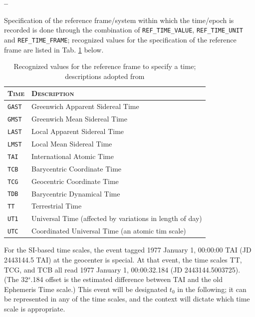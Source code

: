 \documentclass[a4paper,10pt,bibtotoc]{scrreprt}
\begin{document}
\begin{list}{\textbf{--}}{}
\item Specification of the reference frame/system within which the
  time/epoch is recorded is done through the combination of
  \verb|REF_TIME_VALUE|, \verb|REF_TIME_UNIT| and
  \verb|REF_TIME_FRAME|; recognized values for the specification of
  the reference frame are listed in Tab. \ref{tab:reference-frames-time} below.
  
  \begin{table}[ht]
    \centering
    \begin{tabular}{|p{3cm}p{11cm}|}
      \hline
      \textsc{Time} & \textsc{Description} \\
      \hline \hline
      \texttt{GAST} & Greenwich Apparent Sidereal Time \\
      \texttt{GMST} & Greenwich Mean Sidereal Time \\
      \texttt{LAST} & Local Apparent Sidereal Time \\
      \texttt{LMST} & Local Mean Sidereal Time \\
      \texttt{TAI}  & International Atomic Time \\
      \texttt{TCB}  & Barycentric Coordinate Time \\
      \texttt{TCG}  & Geocentric Coordinate Time \\
      \texttt{TDB}  & Barycentric Dynamical Time \\
      \texttt{TT}   & Terrestrial Time \\
      \texttt{UT1}  & Universal Time (affected by variations in length
      of day) \\
      \texttt{UTC}  & Coordinated Universal Time (an atomic tim scale) \\
      \hline
    \end{tabular}
    \caption{Recognized values for the reference frame to specify a
      time; descriptions adopted from \cite{kaplan.2000}}
    \label{tab:reference-frames-time}
  \end{table}
  
  For the SI-based time scales, the event tagged 1977 January 1,
  00:00:00 TAI (JD 2443144.5 TAI) at the geocenter is special. At that
  event, the time scales TT, TCG, and TCB all read 1977 January 1,
  00:00:32.184 (JD 2443144.5003725). (The 32$^s$.184 offset is the
  estimated difference between TAI and the old Ephemeris Time scale.)
  This event will be designated $t_0$ in the following; it can be
  represented in any of the time scales, and the context will dictate
  which time scale is appropriate. 


\end{list}
\end{document}
